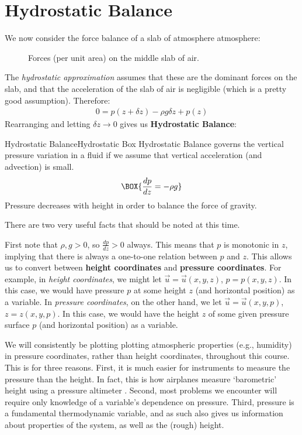 \section{Hydrostatic Balance}

We now consider the force balance of a slab of atmosphere atmosphere: 

\begin{figure}[H]
    \centering
    \hspace*{1.5in}
    
    \caption{Forces (per unit area) on the middle slab of air.}
    \label{Hydrostatic_fig}
\end{figure}

The \textit{hydrostatic approximation} assumes that these are the dominant forces on the slab, and that the acceleration of the slab of air is negligible (which is a pretty good assumption). Therefore:
\begin{align*}
    0=p(z+\delta z)-\rho g\delta z+p(z)
\end{align*}
Rearranging and letting $\delta z\to0$ gives us \textbf{Hydrostatic Balance}:
\begin{fact}{Hydrostatic Balance}{Hydrostatic Box}\label{Hydrostatic Box}
Hydrostatic Balance governs the vertical pressure variation in a fluid if we assume that vertical acceleration (and advection) is small.
    \begin{equation}\label{Hydrostatic Balance}
    \BOX{
        \frac{dp}{dz}=-\rho g
    }
    \end{equation}
Pressure decreases with height in order to balance the force of gravity.
\end{fact}
\noindent There are two very useful facts that should be noted at this time. 

First note that $\rho,g>0$, so $\frac{dp}{dz}>0$ always. This means that $p$ is monotonic in $z$, implying that there is always a one-to-one relation between $p$ and $z$. This allows us to convert between \textbf{height coordinates} and \textbf{pressure coordinates}. For example, in \textit{height coordinates}, we might let $\vec{u}=\vec{u}(x,y,z)$, $p=p(x,y,z)$. In this case, we would have pressure $p$ at some height $z$ (and horizontal position) as  a variable. In \textit{pressure coordinates}, on the other hand, we let $\vec{u}=\vec{u}(x,y,p)$, $z=z(x,y,p)$. In this case, we would have the height $z$ of some given pressure surface $p$ (and horizontal position) as a variable.

We will consistently be plotting plotting atmospheric properties (e.g., humidity) in pressure coordinates, rather than height coordinates, throughout this course. This is for three reasons. First, it is much easier for instruments to measure the pressure than the height. In fact, this is how airplanes measure `barometric' height using a pressure altimeter \cite{Altimeter}. Second, most problems we encounter will require only knowledge of a variable's dependence on pressure. Third, pressure is a fundamental thermodynamic variable, and as such also gives us information about properties of the system, as well as the (rough) height.

